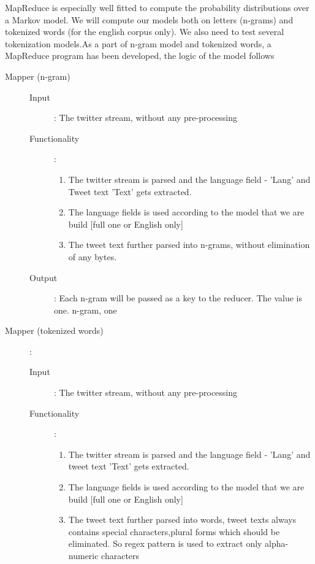 \documentclass[a4paper,11pt]{article}
\begin{document}
MapReduce is especially well fitted to compute the probability distributions over a Markov model. We will compute our models both on letters (n-grams) and tokenized words (for the english corpus only). We also need to test several tokenization models.As a part of n-gram model and tokenized words, a MapReduce program has been developed, the logic of the model follows
\begin{flushleft}

\begin{description}

\item[Mapper (n-gram)]

\begin{description}
\item[Input]: The twitter stream, without any pre-processing

\item[Functionality]: \begin{enumerate} 
          \item The twitter stream is parsed and the language field - 'Lang'	and Tweet text 'Text' gets extracted.
	\item The language fields is used according to the model that we are build [full one or English only]
          \item The tweet text further parsed into n-grams, without elimination of any bytes.
\end{enumerate}

\item[Output]: Each n-gram will be passed as a key to the reducer. The value is one. {n-gram, one}
\end{description}

\item[Mapper (tokenized words)]:

\begin{description}
\item[Input]: The twitter stream, without any pre-processing

\item[Functionality]: \begin{enumerate}
	\item  The twitter stream is parsed and the language field - 'Lang' and tweet text 'Text' gets extracted.
	\item The language fields is used according to the model that we are build [full one or English only]
	\item The tweet text further parsed into words, tweet texts always contains special characters,plural forms which should be eliminated. So regex pattern is used to extract only alpha-numeric characters
\end{enumerate} 


\end{description}
\end{description}
\end{flushleft}
\end{document}
